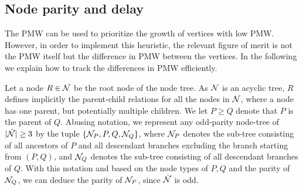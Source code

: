 \subsection{Node parity and delay}\label{sec:paritydelay}
The PMW can be used to prioritize the growth of vertices with low PMW. However, in order to implement this heuristic, the relevant figure of merit is not the PMW itself but the difference in PMW between the vertices. In the following we explain how to track the differences in PMW efficiently.



Let a node $R\in \mathcal{N}$ be the root node of the node tree. As $\mathcal{N}$ is an acyclic tree, $R$ defines implicitly the parent-child relations for all the nodes in $\mathcal{N}$, where a node has one parent, but potentially multiple children. We let $P\geq Q$ denote that $P$ is the parent of $Q$. Abusing notation, we represent any odd-parity node-tree of $\lvert\dot{\mathcal{N}}\rvert\geq 3$ by the tuple $\{\mathcal{N}_P,P,Q,\mathcal{N}_Q\}$, where $\mathcal{N}_P$ denotes the sub-tree consisting of all ancestors of $P$ and all descendant branches excluding the branch starting from $(P,Q)$, and $\mathcal{N}_Q$ denotes the sub-tree consisting of all descendant branches of $Q$. With this notation  %
and based on the node types of $P,Q$ and the parity of $\mathcal{N}_Q$, we can deduce the parity of $\mathcal{N}_P$, since $\dot{\mathcal{N}}$ is odd. 

